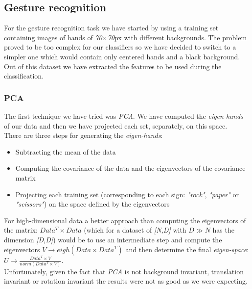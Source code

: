 \documentclass[a4paper, 11pt, twocolumn]{article}
\begin{document}
        \subsection{Gesture recognition}
		For the gesture recognition task we have started by using a training set containing images of hands of \emph{70$\times$70}px with different backgrounds. The problem proved to be too complex for our classifiers so we have decided to switch to a simpler one which would contain only centered hands and a black background.\\ 
		\hspace*{10px}Out of this dataset we have extracted the features to be used during the classification.
		\label{sec:Meth_clssifyHands}
		\subsubsection{PCA}
		The first technique we have tried was \emph{PCA}. We have computed the \emph{eigen-hands} of our data and then we have projected each set, separately, on this space.\\
		\hspace*{10px}There are three steps for generating the \emph{eigen-hands}:
		\begin{itemize}
		\item Subtracting the mean of the data
		\item Computing the covariance of the data and the eigenvectors of the covariance matrix
		\item Projecting each training set (corresponding to each sign: \emph{"rock"}, \emph{"paper"} or \emph{"scissors"}) on the space defined by the eigenvectors
		\end{itemize}
		\hspace*{10px}For high-dimensional data a better approach than computing the eigenvectors of the matrix: \emph{$Data^T \times Data$} (which for a dataset of \emph{[N,D]} with \emph{$D\gg N$} has the dimension \emph{[D,D]}) would be to use an intermediate step and compute the eigenvectors \emph{$V \rightarrow eigh(Data\times Data^T)$} and then determine the final \emph{eigen-space}: \emph{$U \rightarrow \frac{Data^T\times V}{norm(Data^T\times V)}$}.\\
		\hspace*{10px}Unfortunately, given the fact that \emph{PCA} is not background invariant, translation invariant or rotation invariant the results were not as good as we were expecting.	
\end{document}
